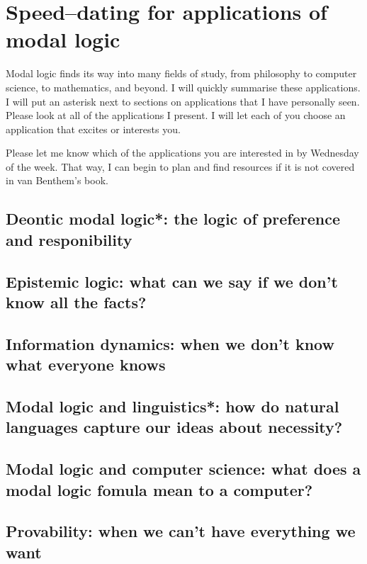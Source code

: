 \chapter[A taste of some applications of modal logic]{Speed--dating for applications of modal logic}

Modal logic finds its way into many fields of study, from philosophy to computer science, to mathematics,
and beyond. I will quickly summarise these applications. I will put an asterisk next
to sections on applications that I have personally seen. Please look at all of the
applications I present. I will let each of you choose an application that excites or
interests you.

Please let me know which of the applications you are interested in by Wednesday of the
week. That way, I can begin to plan and find resources if it is not covered in van
Benthem's book.

\setcounter{section}{-1}

\section{Deontic modal logic*: the logic of preference and responibility}

\section{Epistemic logic: what can we say if we don't know all the facts?}

\section{Information dynamics: when we don't know what everyone knows}

\section{Modal logic and linguistics*: how do natural languages capture our ideas about necessity?}

\section{Modal logic and computer science: what does a modal logic fomula mean to a computer?}

\section{Provability: when we can't have everything we want}